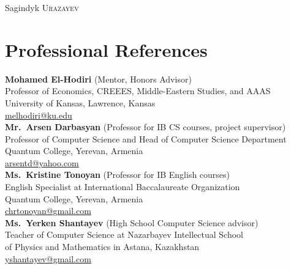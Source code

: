 \documentclass[a4paper,10pt]{article}
\begin{document}
\pagestyle{empty} %

\par{\centering
		{\Huge Sagindyk \textsc{Urazayev}
	}\bigskip\par}


\section{Professional References}

\textbf{Mohamed El-Hodiri} (Mentor, Honors Advisor)\\
Professor of Economics, CREEES, Middle-Eastern Studies, and AAAS\\
University of Kansas, Lawrence, Kansas\\
\href{mailto:melhodiri@ku.edu}{melhodiri@ku.edu}\\

\textbf{Mr.\ Arsen Darbasyan} (Professor for IB CS courses, project supervisor)\\
Professor of Computer Science and Head of Computer Science Department\\
Quantum College, Yerevan, Armenia\\
\href{mailto:arsentd@yahoo.com}{arsentd@yahoo.com}\\

\textbf{Ms.\ Kristine Tonoyan} (Professor for IB English courses)\\
English Specialist at International Baccalaureate Organization\\
Quantum College, Yerevan, Armenia\\
\href{mailto:chrtonoyan@gmail.com}{chrtonoyan@gmail.com}\\

\textbf{Ms.\ Yerken Shantayev} (High School Computer Science advisor)\\
Teacher of Computer Science at Nazarbayev Intellectual School \\of Physics and Mathematics in Astana, Kazakhstan\\
\href{mailto:yshantayev@gmail.com}{yshantayev@gmail.com}\\

\end{document}

